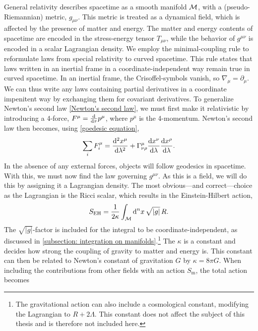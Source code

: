 General relativity describes spacetime as a smooth manifold $\mathcal{M}$, with a (pseudo-Riemannian) metric, $g_{\mu \nu}$.
This metric is treated as a dynamical field, which is affected by the presence of matter and energy.
The matter and energy contents of spacetime are encoded in the stress-energy tensor $T_{\mu \nu}$, while the behavior of $g^{\mu \nu}$ is encoded in a scalar Lagrangian density.
We employ the minimal-coupling rule to reformulate laws from special relativity to curved spacetime.
This rule states that laws written in an inertial frame in a coordinate-independent way remain true in curved spacetime.
In an inertial frame, the Crisoffel-symbols vanish, so $\nabla_\mu = \partial_\mu$.
We can thus write any laws containing partial derivatives in a coordinate impenitent way by exchanging them for covariant derivatives.
To generalize Newton's second law \autoref{Newton's second law}, we must first make it relativistic by introducing a 4-force, $F^\mu = \odv{}{\tau} p^\mu $, where $p^\mu$ is the 4-momentum.
Newton's second law then becomes, using \autoref{goedesic equation},
%
\begin{equation}
    \label{covariant version of second law}
    \sum_i F_i^\mu 
    = \odv[2]{x^\mu}{\lambda} + \Gamma^\mu_{\nu \rho} \odv{x^\nu}{\lambda} \odv{x^\rho}{\lambda}.
\end{equation}
%
In the absence of any external forces, objects will follow geodesics in spacetime.
With this, we must now find the law governing $g^{\mu\nu}$.
As this is a field, we will do this by assigning it a Lagrangian density.
The most obvious---and correct---choice as the Lagrangian is the Ricci scalar, which results in the Einstein-Hilbert action,
%
\begin{equation}
    \label{Einstein-Hilbert action}
    S_{\text{EH}} = \frac{1}{2\kappa}\int_{\mathcal{M}} \text{d}^n x \, \sqrt{|g|}\, R.
\end{equation}
%
The $\sqrt{|g|}$-factor is included for the integral to be coordinate-independent, as discussed in  \autoref{subsection: integration on manifolds}.\footnote{The gravitational action can also include a cosmological constant, modifying the Lagrangian to $R + 2 \Lambda$. This constant does not affect the subject of this thesis and is therefore not included here.}
The $\kappa$ is a constant and decides how strong the coupling of gravity to matter and energy is.
This constant can then be related to Newton's constant of gravitation $G$ by $\kappa = 8 \pi G$.
When including the contributions from other fields with an action $S_\text{m}$, the total action becomes 
